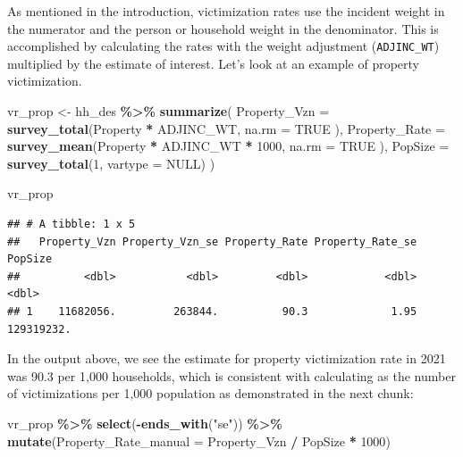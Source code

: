 \documentclass[
]{krantz}
\makeatletter
\newenvironment{Shaded}{\begin{snugshade}}{\end{snugshade}}
\newcommand{\AttributeTok}[1]{\textcolor[rgb]{0.27,0.27,0.27}{#1}}
\newcommand{\ConstantTok}[1]{\textcolor[rgb]{0.37,0.37,0.37}{#1}}
\newcommand{\DecValTok}[1]{\textcolor[rgb]{0.06,0.06,0.06}{#1}}
\newcommand{\FunctionTok}[1]{\textcolor[rgb]{0.27,0.27,0.27}{\textbf{#1}}}
\newcommand{\NormalTok}[1]{#1}
\newcommand{\OtherTok}[1]{\textcolor[rgb]{0.37,0.37,0.37}{#1}}
\newcommand{\SpecialCharTok}[1]{\textcolor[rgb]{0.43,0.43,0.43}{\textbf{#1}}}
\newcommand{\StringTok}[1]{\textcolor[rgb]{0.5,0.5,0.5}{#1}}
\newenvironment{kframe}{%
\medskip{}
\setlength{\fboxsep}{.8em}
 \def\at@end@of@kframe{}%
 \ifinner\ifhmode%
  \def\at@end@of@kframe{\end{minipage}}%
  \begin{minipage}{\columnwidth}%
 \fi\fi%
 \def\FrameCommand##1{\hskip\@totalleftmargin \hskip-\fboxsep
 \colorbox{shadecolor}{##1}\hskip-\fboxsep
     \hskip-\linewidth \hskip-\@totalleftmargin \hskip\columnwidth}%
 \MakeFramed {\advance\hsize-\width
   \@totalleftmargin\z@ \linewidth\hsize
   \@setminipage}}%
 {\par\unskip\endMakeFramed%
 \at@end@of@kframe}
\renewenvironment{Shaded}{\begin{kframe}}{\end{kframe}}
\makeatother
\begin{document}
As mentioned in the introduction, victimization rates use the incident weight in the numerator and the person or household weight in the denominator. This is accomplished by calculating the rates with the weight adjustment (\texttt{ADJINC\_WT}) multiplied by the estimate of interest. Let's look at an example of property victimization.

\begin{Shaded}
\begin{Highlighting}[]
\NormalTok{vr\_prop }\OtherTok{\textless{}{-}}\NormalTok{ hh\_des }\SpecialCharTok{\%\textgreater{}\%}
  \FunctionTok{summarize}\NormalTok{(}
    \AttributeTok{Property\_Vzn =} \FunctionTok{survey\_total}\NormalTok{(Property }\SpecialCharTok{*}\NormalTok{ ADJINC\_WT,}
      \AttributeTok{na.rm =} \ConstantTok{TRUE}
\NormalTok{    ),}
    \AttributeTok{Property\_Rate =} \FunctionTok{survey\_mean}\NormalTok{(Property }\SpecialCharTok{*}\NormalTok{ ADJINC\_WT }\SpecialCharTok{*} \DecValTok{1000}\NormalTok{,}
      \AttributeTok{na.rm =} \ConstantTok{TRUE}
\NormalTok{    ),}
    \AttributeTok{PopSize =} \FunctionTok{survey\_total}\NormalTok{(}\DecValTok{1}\NormalTok{, }\AttributeTok{vartype =} \ConstantTok{NULL}\NormalTok{)}
\NormalTok{  )}

\NormalTok{vr\_prop}
\end{Highlighting}
\end{Shaded}

\begin{verbatim}
## # A tibble: 1 x 5
##   Property_Vzn Property_Vzn_se Property_Rate Property_Rate_se    PopSize
##          <dbl>           <dbl>         <dbl>            <dbl>      <dbl>
## 1    11682056.         263844.          90.3             1.95 129319232.
\end{verbatim}

In the output above, we see the estimate for property victimization rate in 2021 was 90.3 per 1,000 households, which is consistent with calculating as the number of victimizations per 1,000 population as demonstrated in the next chunk:

\begin{Shaded}
\begin{Highlighting}[]
\NormalTok{vr\_prop }\SpecialCharTok{\%\textgreater{}\%}
  \FunctionTok{select}\NormalTok{(}\SpecialCharTok{{-}}\FunctionTok{ends\_with}\NormalTok{(}\StringTok{"se"}\NormalTok{)) }\SpecialCharTok{\%\textgreater{}\%}
  \FunctionTok{mutate}\NormalTok{(}\AttributeTok{Property\_Rate\_manual =}\NormalTok{ Property\_Vzn }\SpecialCharTok{/}\NormalTok{ PopSize }\SpecialCharTok{*} \DecValTok{1000}\NormalTok{)}
\end{Highlighting}
\end{Shaded}
\end{document}
